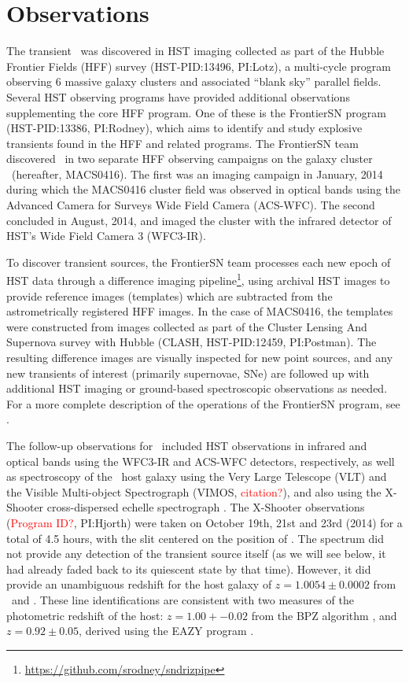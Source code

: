 \section{Observations}\label{sec:Observations}

The transient \spock\ was discovered in HST imaging collected as part
of the Hubble Frontier Fields (HFF) survey (HST-PID:13496, PI:Lotz), a
multi-cycle program observing 6 massive galaxy clusters and associated
``blank sky'' parallel fields.  Several HST observing programs have
provided additional observations supplementing the core HFF program.
One of these is the FrontierSN program (HST-PID:13386, PI:Rodney),
which aims to identify and study explosive transients found in the HFF
and related programs.  The FrontierSN team discovered \spock\ in two
separate HFF observing campaigns on the galaxy cluster
\ (hereafter, MACS0416).  The first was an imaging campaign
in January, 2014 during which the MACS0416 cluster field was observed
in optical bands using the Advanced Camera for Surveys Wide Field
Camera (ACS-WFC).  The second concluded in August, 2014, and imaged
the cluster with the infrared detector of HST's Wide Field Camera 3
(WFC3-IR).

To discover transient sources, the FrontierSN team processes each new
epoch of HST data through a difference imaging
pipeline\footnote{\url{https://github.com/srodney/sndrizpipe}}, using
archival HST images to provide reference images (templates) which are
subtracted from the astrometrically registered HFF images. In the case
of MACS0416, the templates were constructed from images collected as
part of the Cluster Lensing And Supernova survey with Hubble (CLASH,
HST-PID:12459, PI:Postman). The resulting difference images are
visually inspected for new point sources, and any new transients of
interest (primarily supernovae, SNe) are followed up with additional
HST imaging or ground-based spectroscopic observations as needed.  For
a more complete description of the operations of the FrontierSN
program, see \citet{Rodney:2015a}.

The follow-up observations for \spock\ included HST observations in
infrared and optical bands using the WFC3-IR and ACS-WFC detectors,
respectively, as well as spectroscopy of the \spock\ host galaxy using
the Very Large Telescope (VLT) and the Visible Multi-object
Spectrograph (VIMOS, \textcolor{red}{citation?}), and also using the
X-Shooter cross-dispersed echelle spectrograph
\citep{Vernet:2011}. The X-Shooter observations
(\textcolor{red}{Program ID?}, PI:Hjorth) were taken on October 19th,
21st and 23rd (2014) for a total of 4.5 hours, with the slit centered
on the position of .  The spectrum did not provide any
detection of the transient source itself (as we will see below, it had
already faded back to its quiescent state by that time).  However, it
did provide an unambiguous redshift for the host galaxy of
$z=1.0054\pm0.0002$ from \Ha\ and .  These line
identifications are consistent with two measures of the photometric
redshift of the host: $z=1.00+-0.02$ from the BPZ algorithm
\citep{Benitez:2000}, and $z=0.92\pm0.05$, derived using the EAZY
program \citep{Brammer:2008}.

